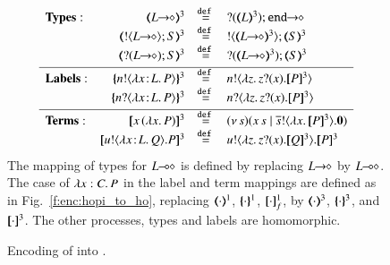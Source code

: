 \begin{figure}[t]
\[
\begin{array}{lrcll}
\noindent{\bf Types:} & 
		\tmap{\shot{L}}{3} &\defeq& \shot{\btinp{\tmap{L}{3}} \tinact}
		\\
&		\tmap{\btout{\shot{L}} S}{3} &\defeq& \btout{\tmap{\shot{L}}{3}} \tmap{S}{3}
		\\
&		\tmap{\btinp{\shot{L}} S}{3} &\defeq& \btinp{\tmap{\shot{L}}{3}} \tmap{S}{3}
\\[1mm]
\hline
\noindent{\bf Labels:} & 
		\mapa{\bactout{n}{\abs{\AT{x}{L}}{P}}}^{3} &\defeq& \bactout{n}{\abs{z}{\binp{z}{x} \pmap{P}{3}}}
		\\
&		\mapa{\bactinp{n}{\abs{\AT{x}{L}}{P}}}^{3} &\defeq& \bactinp{n}{\abs{z}{\binp{z}{x} \pmap{P}{3}}}
\\[1mm]
\hline
{\bf Terms}: & 
	\pmap{\appl{x}{(\abs{x} P)}}{3} &\defeq& \newsp{s}{\appl{x}{s} \Par \bout{\dual{s}}{\abs{x} \pmap{P}{3}} \inact}
		\\
&	\pmap{\bout{u}{\abs{\AT{x}{L}}{Q}} P}{3} &\defeq& \bout{u}{\abs{z}{\binp{z}{x} \pmap{Q}{3}}} \pmap{P}{3}
	\end{array}
	\]
The mapping of types for $L\!\! \multimap\!\! \diamond$ is defined by replacing 
$L\!\! \rightarrow\!\! \diamond$ by $L\!\! \multimap\!\! \diamond$. 
The case of $\lambda x:C.\,P$ in the label and term mappings 
are defined as in Fig.~\ref{f:enc:hopi_to_ho}, replacing 
$(\!\!\langle\cdot\rangle\!\!)^{1}$,
$\{\!\!\{\cdot\}\!\!\}^{1}$, 
$[\!\![\cdot]\!\!]^1_f$, by  
$(\!\!\langle\cdot\rangle\!\!)^{3}$,
$\{\!\!\{\cdot\}\!\!\}^{3}$, and 
$[\!\![\cdot]\!\!]^3$. 
The other processes, types and labels are  homomorphic. 
\caption{\label{f:enc:hopip_to_hopi} 
Encoding of \HOpp into \HOp.
}
\Hline
\end{figure} 


